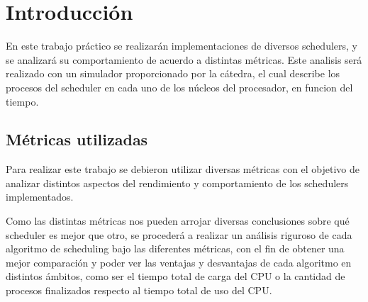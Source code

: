 \documentclass[a4paper]{article}
\begin{document}

\thispagestyle{empty}

\maketitle
\newpage

\thispagestyle{empty}
\vfill
\thispagestyle{empty}
\vspace{1.5cm}
\tableofcontents
\newpage


\newpage

\section{Introducción}
En este trabajo práctico se realizarán implementaciones de diversos
schedulers, y se analizará su comportamiento de acuerdo a distintas
métricas. Este analisis será realizado con un simulador proporcionado por la
cátedra, el cual describe los procesos del scheduler en cada uno de los
núcleos del procesador, en funcion del tiempo.

\subsection{Métricas utilizadas}
Para realizar este trabajo se debieron utilizar diversas métricas con el
objetivo de analizar distintos aspectos del rendimiento y comportamiento de
los schedulers implementados.

Como las distintas métricas nos pueden arrojar diversas conclusiones sobre
qué scheduler es mejor que otro, se procederá a realizar un análisis
riguroso de cada algoritmo de scheduling bajo las diferentes métricas, con
el fin de obtener una mejor comparación y poder ver las ventajas y
desvantajas de cada algoritmo en distintos ámbitos, como ser el tiempo total
de carga del CPU o la cantidad de procesos finalizados respecto al tiempo
total de uso del CPU.
\end{document}
